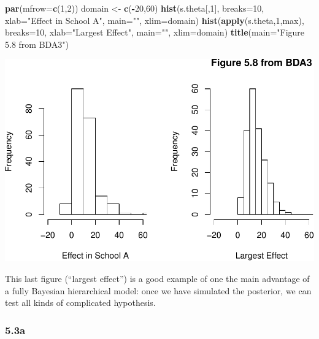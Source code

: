 \documentclass[]{article}
\newenvironment{Shaded}{\begin{snugshade}}{\end{snugshade}}
\newcommand{\KeywordTok}[1]{\textcolor[rgb]{0.13,0.29,0.53}{\textbf{#1}}}
\newcommand{\DataTypeTok}[1]{\textcolor[rgb]{0.13,0.29,0.53}{#1}}
\newcommand{\DecValTok}[1]{\textcolor[rgb]{0.00,0.00,0.81}{#1}}
\newcommand{\StringTok}[1]{\textcolor[rgb]{0.31,0.60,0.02}{#1}}
\newcommand{\OperatorTok}[1]{\textcolor[rgb]{0.81,0.36,0.00}{\textbf{#1}}}
\newcommand{\NormalTok}[1]{#1}
\begin{document}
\begin{Shaded}
\begin{Highlighting}[]
\KeywordTok{par}\NormalTok{(}\DataTypeTok{mfrow=}\KeywordTok{c}\NormalTok{(}\DecValTok{1}\NormalTok{,}\DecValTok{2}\NormalTok{))  }
\NormalTok{domain           <-}\StringTok{ }\KeywordTok{c}\NormalTok{(}\OperatorTok{-}\DecValTok{20}\NormalTok{,}\DecValTok{60}\NormalTok{)}
\KeywordTok{hist}\NormalTok{(s.theta[,}\DecValTok{1}\NormalTok{], }\DataTypeTok{breaks=}\DecValTok{10}\NormalTok{, }\DataTypeTok{xlab=}\StringTok{"Effect in School A"}\NormalTok{, }\DataTypeTok{main=}\StringTok{""}\NormalTok{, }\DataTypeTok{xlim=}\NormalTok{domain)}
\KeywordTok{hist}\NormalTok{(}\KeywordTok{apply}\NormalTok{(s.theta,}\DecValTok{1}\NormalTok{,max), }\DataTypeTok{breaks=}\DecValTok{10}\NormalTok{, }\DataTypeTok{xlab=}\StringTok{"Largest Effect"}\NormalTok{, }\DataTypeTok{main=}\StringTok{""}\NormalTok{, }\DataTypeTok{xlim=}\NormalTok{domain)}
\KeywordTok{title}\NormalTok{(}\DataTypeTok{main=}\StringTok{"Figure 5.8 from BDA3"}\NormalTok{)}
\end{Highlighting}
\end{Shaded}

\includegraphics{Untitled_files/figure-latex/unnamed-chunk-12-1.pdf}

This last figure (``largest effect'') is a good example of one the main
advantage of a fully Bayesian hierarchical model: once we have simulated
the posterior, we can test all kinds of complicated hypothesis.

\subsubsection{5.3a}\label{a-3}
\end{document}
